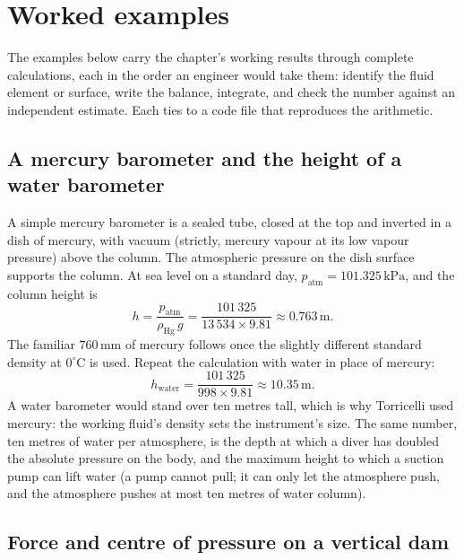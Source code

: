 \section{Worked examples}

The examples below carry the chapter's working results through complete
calculations, each in the order an engineer would take them: identify
the fluid element or surface, write the balance, integrate, and check
the number against an independent estimate. Each ties to a code file
that reproduces the arithmetic.

\subsection{A mercury barometer and the height of a water barometer}

A simple mercury barometer is a sealed tube, closed at the top and
inverted in a dish of mercury, with vacuum (strictly, mercury vapour at
its low vapour pressure) above the column. The atmospheric pressure on
the dish surface supports the column. At sea level on a standard day,
$p_{\text{atm}} = 101.325\,\text{kPa}$, and the column height is
\[
h = \frac{p_{\text{atm}}}{\rho_{\text{Hg}}\, g}
= \frac{101\,325}{13\,534 \times 9.81}
\approx 0.763\,\si{\meter}.
\]
The familiar $760\,\si{\milli\meter}$ of mercury follows once the
slightly different standard density at $0^{\circ}\text{C}$ is used.
Repeat the calculation with water in place of mercury:
\[
h_{\text{water}} = \frac{101\,325}{998 \times 9.81}
\approx 10.35\,\si{\meter}.
\]
A water barometer would stand over ten metres tall, which is why
Torricelli used mercury: the working fluid's density sets the
instrument's size. The same number, ten metres of water per atmosphere,
is the depth at which a diver has doubled the absolute pressure on the
body, and the maximum height to which a suction pump can lift water (a
pump cannot pull; it can only let the atmosphere push, and the
atmosphere pushes at most ten metres of water column).

\subsection{Force and centre of pressure on a vertical dam}

